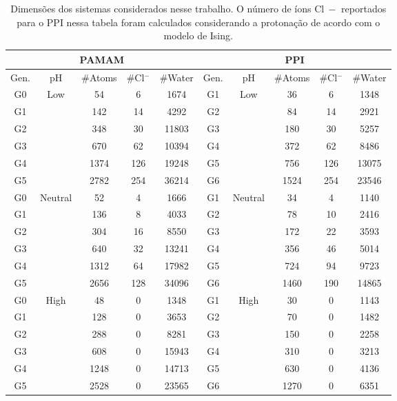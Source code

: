 \begin{table}[ht]
\centering
    \begin{tabular}{ccccc|ccccc}
    \hline
    \multicolumn{5}{c|}{PAMAM} & \multicolumn{5}{c}{PPI} \\
    \hline
    Gen.    &  pH  &    \#Atoms    &    \#Cl$^{-}$ &    \#Water & Gen.      &  pH  &    \#Atoms    &    \#Cl$^{-}$ &    \#Water    \\
    \hline
    G0  &  \multirow{6}{*}{Low}  &   54      &   6   &   1674    & G1     &  \multirow{6}{*}{Low}&   36      &   6   &   1348\\
    G1  &    &   142     &   14  &   4292    & G2     &  &   84      &   14  &   2921\\
    G2  &    &   348     &   30  &   11803   & G3     &  &   180     &   30  &   5257\\
    G3  &    &   670     &   62  &   10394   & G4     &  &   372     &   62  &   8486\\
    G4  &    &   1374    &   126 &   19248   & G5     &  &   756     &   126 &   13075\\
    G5  &    &   2782    &   254 &   36214   & G6     &  &   1524    &   254 &   23546\\
    \hline 
    G0  &  \multirow{6}{*}{Neutral} &    52      &   4   &   1666    & G1     &  \multirow{6}{*}{Neutral}&   34      &   4   &   1140\\
    G1  &  &    136     &   8   &   4033    & G2     &  &    78      &   10  &   2416\\
    G2  &  &    304     &   16  &   8550    & G3     &  &    172     &   22  &   3593\\
    G3  &  &    640     &   32  &   13241   & G4     &  &    356     &   46  &   5014\\
    G4  &  &    1312    &   64  &   17982   & G5     &  &    724     &   94  &   9723\\
    G5  &  &    2656    &   128 &   34096   & G6     &  &    1460    &   190 &   14865\\
    \hline
    G0  &  \multirow{6}{*}{High}&   48      &   0   &   1348    & G1     &  \multirow{6}{*}{High}&    30      &   0   &   1143\\
    G1  &  &   128     &   0   &   3653    & G2     &  &   70      &   0   &   1482\\
    G2  &  &   288     &   0   &   8281    & G3     &  &   150     &   0   &   2258\\
    G3  &  &   608     &   0   &   15943   & G4     &  &   310     &   0   &   3213\\
    G4  &  &   1248    &   0   &   14713   & G5     &  &   630     &   0   &   4136\\
    G5  &  &   2528    &   0   &   23565   & G6     &  &   1270    &   0   &   6351\\
    \hline
    \end{tabular}
    \caption{Dimensões dos sistemas considerados nesse trabalho. O número de íons Cl$~{-}$ reportados para o PPI nessa tabela foram calculados considerando a protonação de acordo com o modelo de Ising\cite{VanDuijvenbode1998, Koper1997}.}
    \label{tab:sistemas}
\end{table} 

